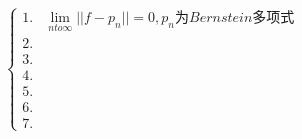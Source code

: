 \documentclass[UTF8]{ctexart}
\begin{document}
\[
\left\{
\begin{aligned}
	1.&\lim\limits_{n to \infty}||f-p_{n}||=0,p_n\text{为}Bernstein\text{多项式}
	\\
	2.&
	\\
	3.&
	\\
	4.&
	\\
	5.&
	\\
	6.&
	\\
	7.&
	
\end{aligned}
\right.
\]
\end{document}
